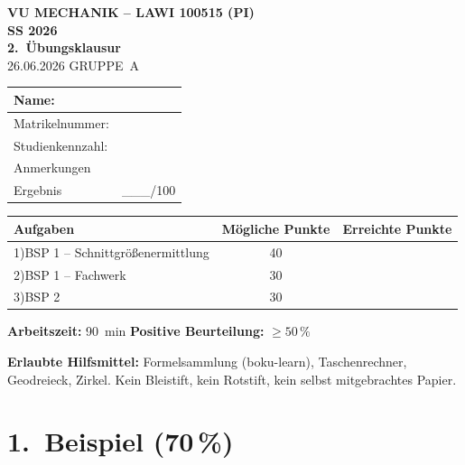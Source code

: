 \documentclass[a4paper,11pt]{article}
\begin{document}

\begin{center}
  {\LARGE\bfseries VU MECHANIK -- LAWI 100515 (PI)\\[4pt]
  SS 2026}\\[10pt]
  {\Large\bfseries 2.~Übungsklausur}\\[4pt]
  {\large 26.06.2026 \quad GRUPPE~A}
\end{center}

\vspace{6pt}
\begin{center}
\begin{tabular}{|p{4.5cm}|p{8cm}|}
\hline
Name: & \\[8pt] \hline
Matrikelnummer: & \\[8pt] \hline
Studienkennzahl: & \\[8pt] \hline
Anmerkungen & \\[14pt] \hline
\multicolumn{1}{|l|}{Ergebnis} & \hspace{3cm}\_\_\_/100 \\[6pt] \hline
\end{tabular}
\end{center}

\vspace{6pt}
\begin{tabular}{lcc}
\toprule
\textbf{Aufgaben} & \textbf{Mögliche Punkte} & \textbf{Erreichte Punkte} \\
\midrule
1)\;BSP 1 -- Schnittgrößenermittlung  & 40 & \\
2)\;BSP 1 -- Fachwerk                 & 30 & \\
3)\;BSP 2                              & 30 & \\
\bottomrule
\end{tabular}

\medskip
\textbf{Arbeitszeit:} 90~min\quad
\textbf{Positive Beurteilung:} $\geq 50\,\%$

\textbf{Erlaubte Hilfsmittel:} Formelsammlung (boku-learn), Taschenrechner, Geodreieck, Zirkel.
Kein Bleistift, kein Rotstift, kein selbst mitgebrachtes Papier.

\newpage
\section*{1.~Beispiel \hfill (70\,\%)}
\end{document}
